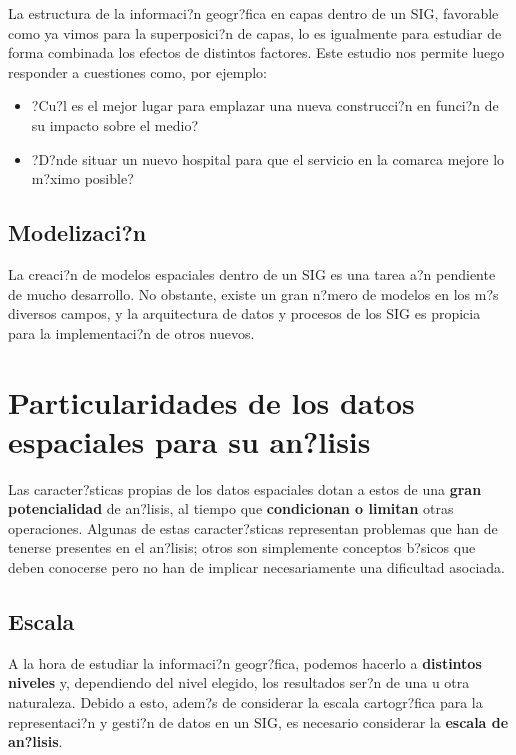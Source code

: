 La estructura de la informaci?n geogr?fica en capas dentro de un SIG, favorable como ya vimos para la superposici?n de capas, lo es igualmente para estudiar de forma combinada los efectos de distintos factores. Este estudio nos permite luego responder a cuestiones como, por ejemplo:

\begin{itemize}
\item ?Cu?l es el mejor lugar para emplazar una nueva construcci?n en funci?n de su impacto sobre el medio?

\item ?D?nde situar un nuevo hospital para que el servicio en la comarca mejore lo m?ximo posible?
\end{itemize}

\subsection{Modelizaci?n}

La creaci?n de modelos espaciales dentro de un SIG es una tarea a?n pendiente de mucho desarrollo. No obstante, existe un gran n?mero de modelos en los m?s diversos campos, y la arquitectura de datos y procesos de los SIG es propicia para la implementaci?n de otros nuevos.


\section{Particularidades de los datos espaciales para su an?lisis}

Las caracter?sticas propias de los datos espaciales dotan a estos de una \textbf{gran potencialidad} de an?lisis, al tiempo que \textbf{condicionan o limitan} otras operaciones. Algunas de estas caracter?sticas representan problemas que han de tenerse presentes en el an?lisis; otros son simplemente conceptos b?sicos que deben conocerse pero no han de implicar necesariamente una dificultad asociada.

\subsection{Escala}


A la hora de estudiar la informaci?n geogr?fica, podemos hacerlo a \textbf{distintos niveles} y, dependiendo del nivel elegido, los resultados ser?n de una u otra naturaleza. Debido a esto, adem?s de considerar la escala cartogr?fica para la representaci?n y gesti?n de datos en un SIG, es necesario considerar la \textbf{escala de an?lisis}.

